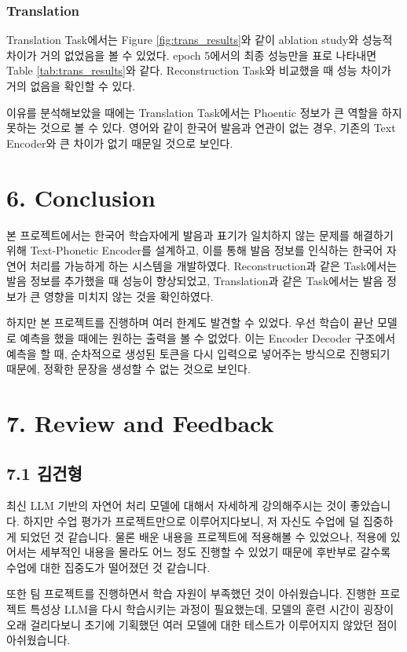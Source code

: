 \documentclass[letterpaper]{article} %
\begin{document}
\subsubsection{Translation}

Translation Task에서는 Figure \ref{fig:trans_results}와 같이 ablation study와 성능적 차이가 거의 없었음을 볼 수 있었다. epoch 5에서의 최종 성능만을 표로 나타내면 Table \ref{tab:trans_results}와 같다. Reconstruction Task와 비교했을 때 성능 차이가 거의 없음을 확인할 수 있다.

이유를 분석해보았을 때에는 Translation Task에서는 Phoentic 정보가 큰 역할을 하지 못하는 것으로 볼 수 있다.
영어와 같이 한국어 발음과 연관이 없는 경우, 기존의 Text Encoder와 큰 차이가 없기 때문일 것으로 보인다.



\section{6. Conclusion}
본 프로젝트에서는 한국어 학습자에게 발음과 표기가 일치하지 않는 문제를 해결하기 위해 Text-Phonetic Encoder를 설계하고, 이를 통해 발음 정보를 인식하는 한국어 자연어 처리를 가능하게 하는 시스템을 개발하였다.
Reconstruction과 같은 Task에서는 발음 정보를 추가했을 때 성능이 향상되었고, Translation과 같은 Task에서는 발음 정보가 큰 영향을 미치지 않는 것을 확인하였다.

하지만 본 프로젝트를 진행하며 여러 한계도 발견할 수 있었다. 우선 학습이 끝난 모델로 예측을 했을 때에는 원하는 출력을 볼 수 없었다. 
이는 Encoder Decoder 구조에서 예측을 할 때, 순차적으로 생성된 토큰을 다시 입력으로 넣어주는 방식으로 진행되기 때문에, 정확한 문장을 생성할 수 없는 것으로 보인다.

\section{7. Review and Feedback}
\subsection{7.1 김건형}
최신 LLM 기반의 자연어 처리 모델에 대해서 자세하게 강의해주시는 것이 좋았습니다. 하지만 수업 평가가 프로젝트만으로 이루어지다보니, 저 자신도 수업에 덜 집중하게 되었던 것 같습니다. 물론 배운 내용을 프로젝트에 적용해볼 수 있었으나, 적용에 있어서는 세부적인 내용을 몰라도 어느 정도 진행할 수 있었기 때문에 후반부로 갈수록 수업에 대한 집중도가 떨어졌던 것 같습니다.

또한 팀 프로젝트를 진행하면서 학습 자원이 부족했던 것이 아쉬웠습니다. 진행한 프로젝트 특성상 LLM을 다시 학습시키는 과정이 필요했는데, 모델의 훈련 시간이 굉장이 오래 걸리다보니 초기에 기획했던 여러 모델에 대한 테스트가 이루어지지 않았던 점이 아쉬웠습니다.
\end{document}
